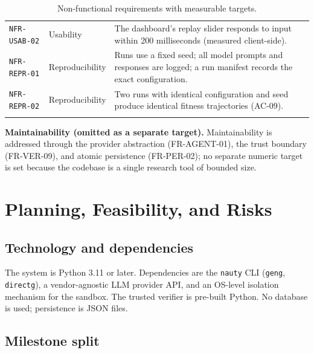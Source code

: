 \documentclass[12pt,a4paper]{article}
\begin{document}
\begin{center}
\begin{longtable}{@{}p{2.4cm}p{2.0cm}p{8.4cm}@{}}
\addlinespace[2pt]
\texttt{NFR-USAB-02} & Usability & The dashboard's replay slider responds to input within 200 milliseconds (measured client-side). \\
\addlinespace[2pt]
\texttt{NFR-REPR-01} & Reproducibility & Runs use a fixed seed; all model prompts and responses are logged; a run manifest records the exact configuration. \\
\addlinespace[2pt]
\texttt{NFR-REPR-02} & Reproducibility & Two runs with identical configuration and seed produce identical fitness trajectories (AC-09). \\
\bottomrule
\caption{Non-functional requirements with measurable targets.}
\label{tab:nfr}
\end{longtable}
\end{center}

\textbf{Maintainability (omitted as a separate target).} Maintainability is addressed through the provider abstraction (FR-AGENT-01), the trust boundary (FR-VER-09), and atomic persistence (FR-PER-02); no separate numeric target is set because the codebase is a single research tool of bounded size.

\section{Planning, Feasibility, and Risks}

\subsection{Technology and dependencies}

The system is Python 3.11 or later. Dependencies are the \texttt{nauty} CLI (\texttt{geng}, \texttt{directg}), a vendor-agnostic LLM provider API, and an OS-level isolation mechanism for the sandbox. The trusted verifier is pre-built Python. No database is used; persistence is JSON files.

\subsection{Milestone split}
\end{document}
